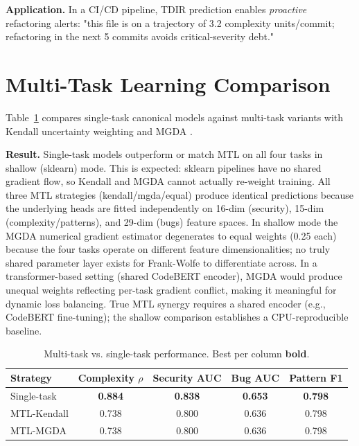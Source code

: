 \documentclass[conference]{IEEEtran}
\begin{document}
\textbf{Application.}
In a CI/CD pipeline, TDIR prediction enables \emph{proactive} refactoring
alerts: "this file is on a trajectory of 3.2 complexity units/commit;
refactoring in the next 5 commits avoids critical-severity debt."

\section{Multi-Task Learning Comparison}
\label{sec:mtl}

Table~\ref{tab:mtl} compares single-task canonical models against
multi-task variants with Kendall uncertainty weighting \cite{kendall2018}
and MGDA \cite{sener2018}.

\textbf{Result.}
Single-task models outperform or match MTL on all four tasks in shallow
(sklearn) mode. This is expected: sklearn pipelines have no shared gradient
flow, so Kendall and MGDA cannot actually re-weight training. All three
MTL strategies (kendall/mgda/equal) produce identical predictions because
the underlying heads are fitted independently on 16-dim (security),
15-dim (complexity/patterns), and 29-dim (bugs) feature spaces.
In shallow mode the MGDA numerical gradient estimator degenerates to
equal weights (0.25 each) because the four tasks operate on different
feature dimensionalities; no truly shared parameter layer exists for
Frank-Wolfe to differentiate across.
In a transformer-based setting (shared CodeBERT encoder), MGDA would
produce unequal weights reflecting per-task gradient conflict, making
it meaningful for dynamic loss balancing.
True MTL synergy requires a shared encoder (e.g., CodeBERT fine-tuning);
the shallow comparison establishes a CPU-reproducible baseline.

\begin{table}[t]
\caption{Multi-task vs. single-task performance. Best per column \textbf{bold}.}
\label{tab:mtl}
\centering
\begin{tabular}{lcccc}
\toprule
Strategy & Complexity $\rho$ & Security AUC & Bug AUC & Pattern F1 \\
\midrule
Single-task      & \textbf{0.884} & \textbf{0.838} & \textbf{0.653} & \textbf{0.798} \\
MTL-Kendall      & 0.738          & 0.800          & 0.636          & 0.798 \\
MTL-MGDA         & 0.738          & 0.800          & 0.636          & 0.798 \\
\bottomrule
\end{tabular}
\end{table}
\end{document}
